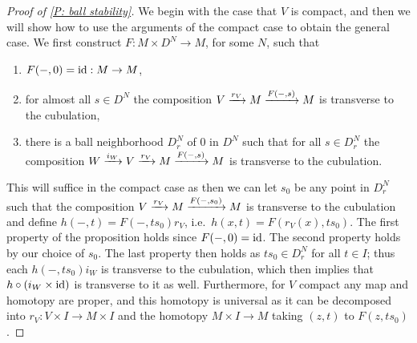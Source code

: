 \begin{proof}[Proof of \cref{P: ball stability}]
We begin with the case that $V$ is compact, and then we will show how to use the arguments of the compact case to obtain the general case.  We first construct $F:M\times D^N\to M$, for some $N$, such that

\begin{enumerate}

\item $F(-,0)=\mathrm{id}:M\to M$,
\item for almost all $s\in D^N$ the composition $V\xrightarrow{r_V} M\xrightarrow{F(-,s)}M$ is transverse to the cubulation,

\item  there is a ball neighborhood $D_r^N$ of $0$ in $D^N$ such that for all $s\in D_r^N$ the composition $W\xrightarrow{i_{W}} V\xrightarrow{r_V} M\xrightarrow{F(-,s)}M$ is transverse to the cubulation.
\end{enumerate}



This will suffice in the compact case as then we can let $s_0$ be any point in $D_r^N$ such that the composition $V\xrightarrow{r_V} M\xrightarrow{F(-,s_0)}M$ is transverse to the cubulation and define $h(-,t)=F(-,ts_0)r_V$, i.e.\ $h(x,t)=F(r_V(x),ts_0)$.  The first property of the proposition holds since $F(-,0)=\mathrm{id}$. The second property holds by our choice of $s_0$.  The last property then holds as $ts_0\in D_r^N$ for all $t\in I$; thus each $h(-,ts_0)i_W$ is transverse to the cubulation, which then implies that  $h\circ(i_{W}\times \mathrm{id})$ is transverse to it as well. Furthermore, for $V$ compact any map and homotopy are proper, and this homotopy is universal as it can be decomposed into $r_V:V\times I\to M\times I$ and the homotopy $M\times I\to M$ taking $(z,t)$ to $F(z,ts_0)$.




\end{proof}

